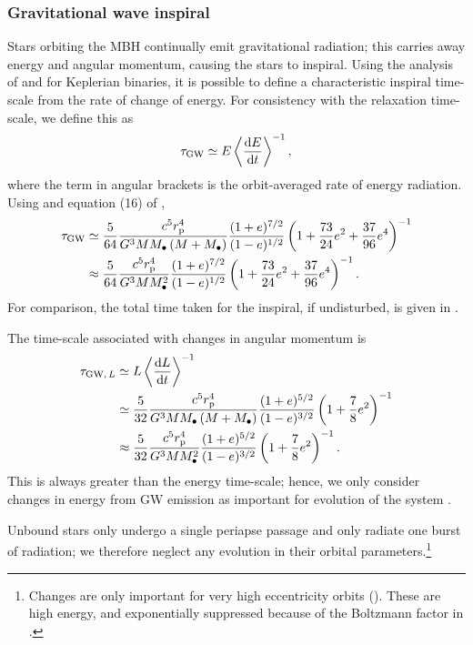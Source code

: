 \subsubsection{Gravitational wave inspiral}\label{sec:GW-in}

Stars orbiting the MBH continually emit gravitational radiation; this carries away energy and angular momentum, causing the stars to inspiral. Using the analysis of \citet{Peters1963} and \citet{Peters1964} for Keplerian binaries, it is possible to define a characteristic inspiral time-scale from the rate of change of energy. For consistency with the relaxation time-scale, we define this as \citep{MiraldaEscude2000, Merritt2011}
\begin{equation}
\tau_\mathrm{GW} \simeq E\left\langle\dfrac{\mathrm{d} {E}}{\mathrm{d} {t}}\right\rangle^{-1},
\label{eq:tGW-def}
\end{equation}
where the term in angular brackets is the orbit-averaged rate of energy radiation. Using  and equation (16) of \citet{Peters1963},
\begin{align}
\tau_\mathrm{GW} \simeq {} & \dfrac{5}{64}\dfrac{c^5r_\mathrm{p}^4}{G^3MM_\bullet\left(M + M_\bullet\right)}\dfrac{(1+e)^{7/2}}{(1-e)^{1/2}}\left(1+\dfrac{73}{24}e^2 + \dfrac{37}{96}e^4\right)^{-1} \\
 \approx {} & \dfrac{5}{64}\dfrac{c^5r_\mathrm{p}^4}{G^3MM_\bullet^2}\dfrac{(1+e)^{7/2}}{(1-e)^{1/2}}\left(1+\dfrac{73}{24}e^2 + \dfrac{37}{96}e^4\right)^{-1}.
\end{align}
For comparison, the total time taken for the inspiral, if undisturbed, is given in .

The time-scale associated with changes in angular momentum is \citep{Peters1964}
\begin{align}
\tau_{\mathrm{GW},\, L} \simeq {} & L\left\langle\dfrac{\mathrm{d} {L}}{\mathrm{d} {t}}\right\rangle^{-1} \\
 \simeq {} & \dfrac{5}{32}\dfrac{c^5r_\mathrm{p}^4}{G^3MM_\bullet\left(M + M_\bullet\right)}\dfrac{(1+e)^{5/2}}{(1-e)^{3/2}}\left(1+\dfrac{7}{8}e^2\right)^{-1} \\
 \approx {} & \dfrac{5}{32}\dfrac{c^5r_\mathrm{p}^4}{G^3MM_\bullet^2}\dfrac{(1+e)^{5/2}}{(1-e)^{3/2}}\left(1+\dfrac{7}{8}e^2\right)^{-1}.
\end{align}
This is always greater than the energy time-scale; hence, we only consider changes in energy from GW emission as important for evolution of the system \citep{Hopman2005}.

Unbound stars only undergo a single periapse passage and only radiate one burst of radiation; we therefore neglect any evolution in their orbital parameters.\footnote{Changes are only important for very high eccentricity orbits (). These are high energy, and exponentially suppressed because of the Boltzmann factor in .}

